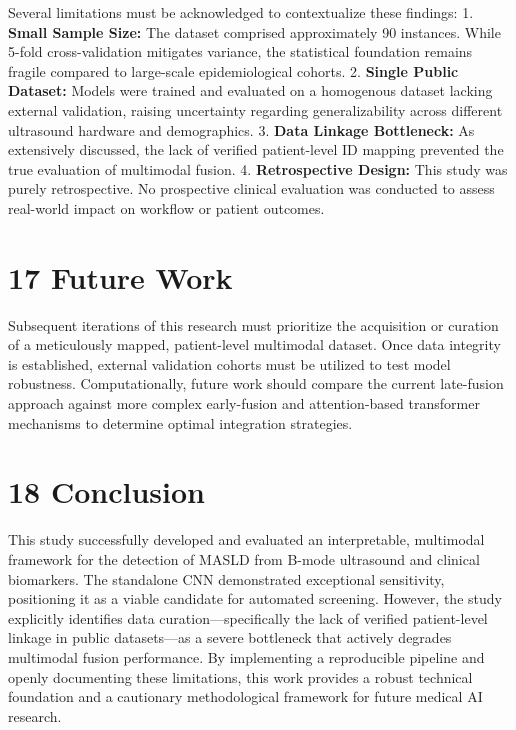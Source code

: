 Several limitations must be acknowledged to contextualize these
findings: 1. \textbf{Small Sample Size:} The dataset comprised
approximately 90 instances. While 5-fold cross-validation mitigates
variance, the statistical foundation remains fragile compared to
large-scale epidemiological cohorts. 2. \textbf{Single Public Dataset:}
Models were trained and evaluated on a homogenous dataset lacking
external validation, raising uncertainty regarding generalizability
across different ultrasound hardware and demographics. 3. \textbf{Data
Linkage Bottleneck:} As extensively discussed, the lack of verified
patient-level ID mapping prevented the true evaluation of multimodal
fusion. 4. \textbf{Retrospective Design:} This study was purely
retrospective. No prospective clinical evaluation was conducted to
assess real-world impact on workflow or patient outcomes.

\section{17 Future Work}\label{future-work}

Subsequent iterations of this research must prioritize the acquisition
or curation of a meticulously mapped, patient-level multimodal dataset.
Once data integrity is established, external validation cohorts must be
utilized to test model robustness. Computationally, future work should
compare the current late-fusion approach against more complex
early-fusion and attention-based transformer mechanisms to determine
optimal integration strategies.

\section{18 Conclusion}\label{conclusion}

This study successfully developed and evaluated an interpretable,
multimodal framework for the detection of MASLD from B-mode ultrasound
and clinical biomarkers. The standalone CNN demonstrated exceptional
sensitivity, positioning it as a viable candidate for automated
screening. However, the study explicitly identifies data
curation---specifically the lack of verified patient-level linkage in
public datasets---as a severe bottleneck that actively degrades
multimodal fusion performance. By implementing a reproducible pipeline
and openly documenting these limitations, this work provides a robust
technical foundation and a cautionary methodological framework for
future medical AI research.

